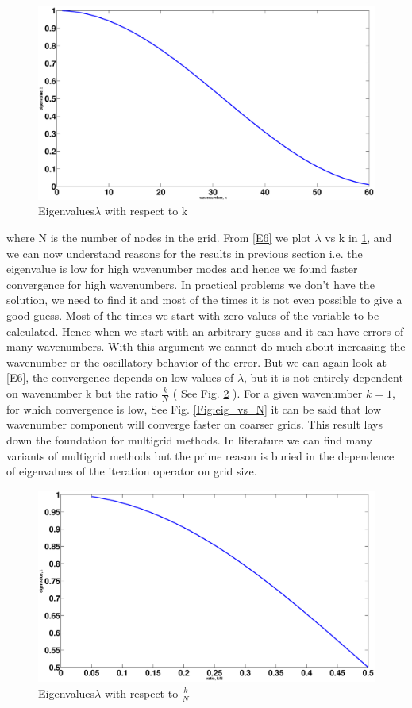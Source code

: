 \begin{figure}
 \centering
 \includegraphics[scale=0.2]{eigen_vs_k.eps}
\caption{Eigenvalues$\lambda$ with respect to k}
 \label{Fig:eig_vs_k}
\end{figure}

where N is the number of nodes in the grid. From \ref{E6} we plot $\lambda$ vs k in \ref{Fig:eig_vs_k}, and we can now understand reasons for the results in previous section i.e.
the eigenvalue is low for high wavenumber modes and hence we found faster convergence for high wavenumbers.  In practical problems we don't have the solution, we need to find it and most of the times it is not even possible to give a good guess. Most
of the times we start with zero values of the variable to be calculated. Hence when we start with an arbitrary guess and it can
have errors of many wavenumbers. With this argument we cannot do much about increasing the wavenumber or the oscillatory behavior of the error.
But we can again look at \ref{E6}, the convergence depends on low values of $\lambda$, but it is not entirely dependent on wavenumber k but the ratio $\frac{k}{N}$ 
( See Fig. \ref{Fig:eig_vs_k-N} ).
For a given wavenumber $k =1$, for which convergence is low, See Fig. \ref{Fig:eig_vs_N} it can be said that low wavenumber component will converge faster on coarser grids.
This result lays down the foundation for multigrid methods. In literature we can find many variants of multigrid methods but the prime reason is buried in the dependence of eigenvalues
of the iteration operator on grid size. 


\begin{figure}
 \centering
 \includegraphics[scale=0.2]{eigen_vs_k-N.eps}
 \caption{Eigenvalues$\lambda$ with respect to $\frac{k}{N}$}
 \label{Fig:eig_vs_k-N}
\end{figure}

